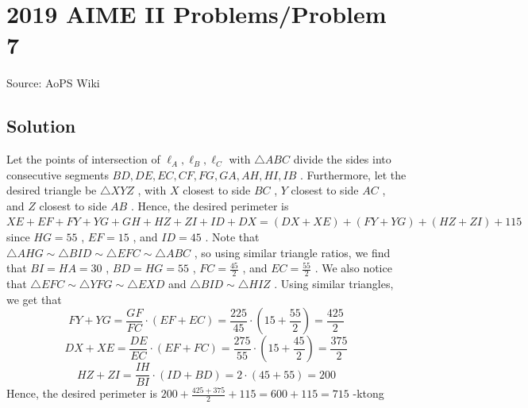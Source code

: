 \documentclass[12pt]{article}
\begin{document}
\section*{{2019 AIME II Problems/Problem 7}}
Source: AoPS Wiki

\subsection*{Solution}
Let the points of intersection of $\ell_A, \ell_B,\ell_C$ with $\triangle ABC$ divide the sides into consecutive segments $BD,DE,EC,CF,FG,GA,AH,HI,IB$ . Furthermore, let the desired triangle be $\triangle XYZ$ , with $X$ closest to side $BC$ , $Y$ closest to side $AC$ , and $Z$ closest to side $AB$ . Hence, the desired perimeter is $XE+EF+FY+YG+GH+HZ+ZI+ID+DX=(DX+XE)+(FY+YG)+(HZ+ZI)+115$ since $HG=55$ , $EF=15$ , and $ID=45$ . Note that $\triangle AHG\sim \triangle BID\sim \triangle EFC\sim \triangle ABC$ , so using similar triangle ratios, we find that $BI=HA=30$ , $BD=HG=55$ , $FC=\frac{45}{2}$ , and $EC=\frac{55}{2}$ . We also notice that $\triangle EFC\sim \triangle YFG\sim \triangle EXD$ and $\triangle BID\sim \triangle HIZ$ . Using similar triangles, we get that \[FY+YG=\frac{GF}{FC}\cdot \left(EF+EC\right)=\frac{225}{45}\cdot \left(15+\frac{55}{2}\right)=\frac{425}{2}\] \[DX+XE=\frac{DE}{EC}\cdot \left(EF+FC\right)=\frac{275}{55}\cdot \left(15+\frac{45}{2}\right)=\frac{375}{2}\] \[HZ+ZI=\frac{IH}{BI}\cdot \left(ID+BD\right)=2\cdot \left(45+55\right)=200\] Hence, the desired perimeter is $200+\frac{425+375}{2}+115=600+115=\boxed{715}$ -ktong
\end{document}
